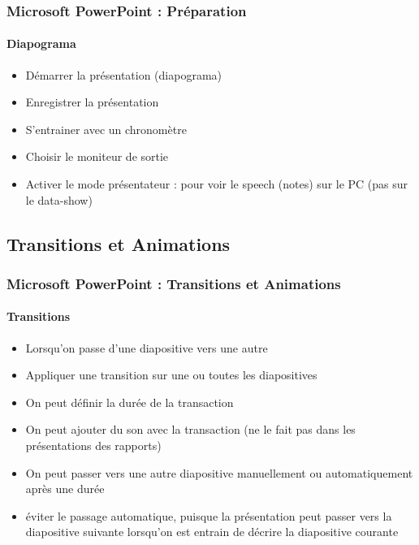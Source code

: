 \documentclass[xcolor=table, usenames,dvipsnames]{beamer}
\begin{document}
\begin{frame}
\frametitle{Microsoft PowerPoint : Préparation}
\framesubtitle{Diapograma}


\begin{minipage}{0.44\textwidth}
	\begin{itemize}
		\item Démarrer la présentation (diapograma) 
		\item Enregistrer la présentation 
		\item S'entrainer avec un chronomètre
		\item Choisir le moniteur de sortie
		\item Activer le mode présentateur : pour voir le speech (notes) sur le PC (pas sur le data-show)
	\end{itemize}
\end{minipage}
%
\begin{minipage}{0.55\textwidth}
\end{minipage}

\end{frame}


\subsection{Transitions et Animations}

\begin{frame}
\frametitle{Microsoft PowerPoint : Transitions et Animations}
\framesubtitle{Transitions}


\begin{itemize}
	\item Lorsqu'on passe d'une diapositive vers une autre
	\item Appliquer une transition sur une ou toutes les diapositives
	\item On peut définir la durée de la transaction
	\item On peut ajouter du son avec la transaction (ne le fait pas dans les présentations des rapports)
	\item On peut passer vers une autre diapositive manuellement ou automatiquement après une durée
	\item éviter le passage automatique, puisque la présentation peut passer vers la diapositive suivante lorsqu'on est entrain de décrire la diapositive courante
\end{itemize}

\end{frame}
\end{document}
